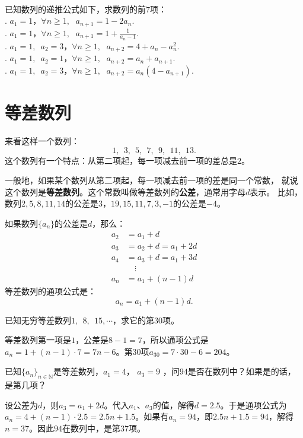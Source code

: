 \documentclass[12pt,UTF8]{ctexbook}
\begin{document}
\begin{xt}
\mbox{}\\
已知数列的递推公式如下，求数列的前$7$项：\\
. $a_1 = 1$，$\forall n \geqslant 1, \;\,\, a_{n+1} = 1 - 2a_n.$\\
. $a_1 = 1$，$\forall n \geqslant 1, \;\,\, a_{n+1} = 1 + \frac{1}{a_n - 1}.$\\
. $a_1 = 1, \,\, \, a_2 = 3$，$\forall n \geqslant 1, \;\,\, a_{n+2} = 4 + a_n - a_n^2.$\\
. $a_1 = 1, \,\, \, a_2 = 1$，$\forall n \geqslant 1, \;\,\, a_{n+2} = a_n +a_{n+1}.$\\
. $a_1 = 1, \,\, \, a_2 = 3$，$\forall n \geqslant 1, \;\,\, a_{n+2} = a_n(4 - a_{n+1}).$
\end{xt}

\section{等差数列}
来看这样一个数列：
$$ 1,\;\,3,\;\,5,\;\,7,\;\,9,\;\,11,\;\, 13. $$
这个数列有一个特点：从第二项起，每一项减去前一项的差总是$2$。

一般地，如果某个数列从第二项起，每一项减去前一项的差是同一个常数，
就说这个数列是\textbf{等差数列}。这个常数叫做等差数列的\textbf{公差}，通常用字母$d$表示。
比如，数列$2,5,8,11,14$的公差是$3$，$19,15,11,7,3,-1$的公差是$-4$。

如果数列$\{a_n\}$的公差是$d$，那么：
\begin{align*}
a_2 &= a_1 + d  \\
a_3 &= a_2 + d = a_1 + 2d  \\
a_4 &= a_3 + d = a_1 + 3d  \\
&\quad \vdots  \\
a_n &= a_1 + (n-1)d  
\end{align*}
等差数列的通项公式是：
$$a_n = a_1 + (n-1)d.$$
\begin{et}
已知无穷等差数列$1,\;\,8,\;\,15, \cdots$，求它的第$30$项。
\end{et}
\begin{so}
等差数列第一项是$1$，公差是$8-1=7$，所以通项公式是$a_n = 1 + (n-1)\cdot 7 = 7n - 6$。第$30$项$a_{30} = 7\cdot 30 - 6 = 204$。
\end{so}
\begin{et}
已知$\{a_n\}_{n\in\mathbb{N}}$是等差数列，$a_1 = 4$， $a_3 = 9$ ，问$94$是否在数列中？如果是的话，是第几项？
\end{et}
\begin{so}
设公差为$d$，则$a_3 = a_1 + 2d$。代入$a_1$、$a_3$的值，解得$d = 2.5$。于是通项公式为$a_n = 4 + (n-1)\cdot 2.5 = 2.5n + 1.5$。如果有$a_n = 94$，即$2.5n + 1.5=94$，解得$n = 37$。因此$94$在数列中，是第$37$项。
\end{so}
\end{document}
